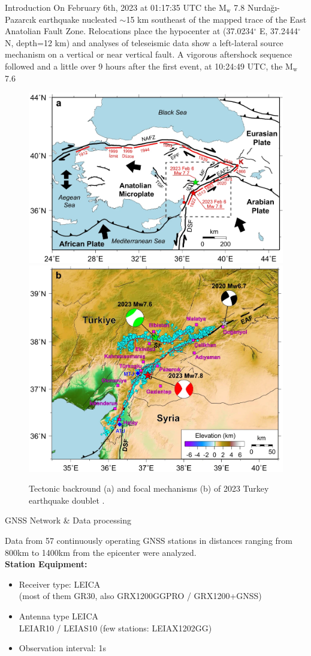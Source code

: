 \documentclass[final,a0,portrait]{beamer}
\newlength{\onecolwid}
\begin{document}
\begin{frame}[t]
\begin{columns}[t]
\begin{column}{\onecolwid}
\begin{block}{Introduction}
{\small
On February 6th, 2023 at 01:17:35 UTC the M$_\text{w}$ 7.8 Nurdağı-Pazarcık earthquake nucleated $\sim$15 km southeast of the mapped trace of the East Anatolian Fault Zone. Relocations  place the hypocenter at (37.0234$^{\circ}$ E, 37.2444$^{\circ}$ N, depth=12 km) and analyses of teleseismic data show a left-lateral source mechanism on a vertical or near vertical fault. A vigorous aftershock sequence followed and a little over 9 hours after the first event, at 10:24:49 UTC, the M$_\text{w}$ 7.6 \cite{Melgar_2023}
}
\begin{figure}
\begin{center}
  \includegraphics[width=.54\textwidth]{figures/eqturk23_tect.png}
  \includegraphics[width=.44\textwidth]{figures/eqturk23_fm.png}
\end{center}
    \caption{Tectonic backround (a) and focal mechanisms (b) of 2023 Turkey earthquake doublet \cite{Liu_2023}.}
    \label{fig:proc-net}
\end{figure} 
\end{block}

\vspace*{-1.5cm}
\begin{block}{GNSS Network \& Data processing}
{\small
Data from 57 continuously operating GNSS stations in distances ranging from 800km to 1400km from the epicenter were analyzed.\\
\textbf{Station Equipment:}
\begin{itemize}\setlength\itemsep{.3em}
  \item Receiver type: LEICA\\
    (most of them GR30, also GRX1200GGPRO / GRX1200+GNSS)
  \item Antenna type LEICA\\
    LEIAR10 / LEIAS10 (few stations: LEIAX1202GG)
  \item Observation interval: 1s
\end{itemize}

}
\end{block}
\end{column}
\end{columns}
\end{frame}
\end{document}
